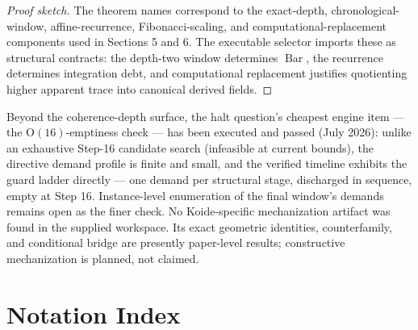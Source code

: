 \documentclass[11pt]{article}
\theoremstyle{plain}
\theoremstyle{definition}
\theoremstyle{remark}
\newenvironment{proofsketch}{\begin{proof}[Proof sketch]}{\end{proof}}
\newcommand{\SelBar}{\operatorname{Bar}}
\begin{document}
\begin{proofsketch}
The theorem names correspond to the exact-depth, chronological-window, affine-recurrence, Fibonacci-scaling, and computational-replacement components used in Sections 5 and 6. The executable selector imports these as structural contracts: the depth-two window determines \(\SelBar\), the recurrence determines integration debt, and computational replacement justifies quotienting higher apparent trace into canonical derived fields.
\end{proofsketch}

Beyond the coherence-depth surface, the halt question's cheapest engine item --- the \(\mathrm{O}(16)\)-emptiness check --- has been executed and passed (July 2026): unlike an exhaustive Step-16 candidate search (infeasible at current bounds), the directive demand profile is finite and small, and the verified timeline exhibits the guard ladder directly --- one demand per structural stage, discharged in sequence, empty at Step 16. Instance-level enumeration of the final window's demands remains open as the finer check. No Koide-specific mechanization artifact was found in the supplied workspace. Its exact geometric identities, counterfamily, and conditional bridge are presently paper-level results; constructive mechanization is planned, not claimed.

\appendix

\section{Notation Index}
\end{document}
